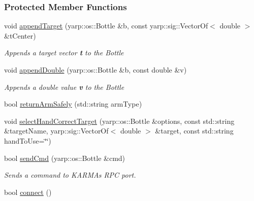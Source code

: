 \subsubsection*{Protected Member Functions}
\begin{DoxyCompactItemize}
\item 
void \hyperlink{group__icubclient__subsystems_a9dc49c4b5c168366758cd9ee23654a42}{append\+Target} (yarp\+::os\+::\+Bottle \&b, const yarp\+::sig\+::\+Vector\+Of$<$ double $>$ \&t\+Center)
\begin{DoxyCompactList}\small\item\em Appends a target vector {\bfseries t} to the Bottle {\bfseries } \end{DoxyCompactList}\item 
void \hyperlink{group__icubclient__subsystems_aa401a2dc18c491f11a1ba36ab6811606}{append\+Double} (yarp\+::os\+::\+Bottle \&b, const double \&v)
\begin{DoxyCompactList}\small\item\em Appends a double value {\bfseries v} to the Bottle {\bfseries } \end{DoxyCompactList}\item 
bool \hyperlink{group__icubclient__subsystems_ab965ba9aa2f810b3a026e91fbc3073df}{return\+Arm\+Safely} (std\+::string arm\+Type)
\item 
void \hyperlink{group__icubclient__subsystems_a8bfb9f15e37ed16130fb2849142417a8}{select\+Hand\+Correct\+Target} (yarp\+::os\+::\+Bottle \&options, const std\+::string \&target\+Name, yarp\+::sig\+::\+Vector\+Of$<$ double $>$ \&target, const std\+::string hand\+To\+Use=\char`\"{}\char`\"{})
\item 
bool \hyperlink{group__icubclient__subsystems_acf93003113c4db21fe8717a2da168bd5}{send\+Cmd} (yarp\+::os\+::\+Bottle \&cmd)
\begin{DoxyCompactList}\small\item\em Sends a command to K\+A\+R\+MA\textquotesingle{}s R\+PC port. \end{DoxyCompactList}\item 
bool \hyperlink{group__icubclient__subsystems_acc63e171efddf99fa1e57ab1cdce3a13}{connect} ()
\end{DoxyCompactItemize}
